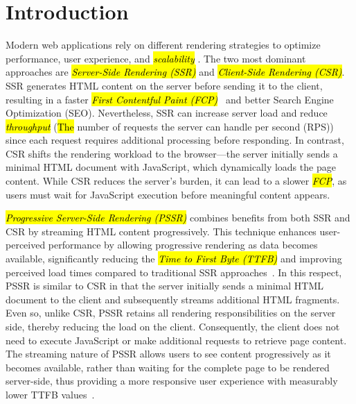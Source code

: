 \documentclass[software,article,accept,pdftex,moreauthors]{Definitions/mdpi}
\begin{document}

\section{Introduction}


Modern web applications rely on different rendering strategies to optimize
performance, user experience, and \textit{\hl{scalability}%
}. The two most dominant
approaches are \textit{\hl{Server-Side Rendering (SSR)}} and \textit{\hl{Client-Side Rendering (CSR)}}. SSR generates HTML content on the server before sending it to the client, resulting in a faster \textit{\hl{First Contentful Paint (FCP)}}~\cite{Edgar2024-FCP} and better Search Engine Optimization (SEO). Nevertheless, SSR
can increase server load and reduce \textit{\hl{throughput}} ({\hl{The} %
 number of
    requests the server can handle per second (RPS)}) since each request requires
additional processing before responding. In contrast, CSR shifts the rendering
workload to the browser---the server initially sends a minimal HTML document with
JavaScript, which dynamically loads the page content. While CSR reduces the
server’s burden, it can lead to a slower \textit{\hl{FCP}}, as users must wait for
JavaScript execution before meaningful content appears.

\textit{\hl{Progressive Server-Side Rendering (PSSR)}} combines benefits from both SSR and CSR
by streaming HTML content progressively. This technique enhances user-perceived performance by
allowing progressive rendering as data becomes available, significantly reducing the
\textit{\hl{Time to First Byte (TTFB)}} and improving perceived load times compared to traditional
SSR approaches~\cite{wise2024pssr}. In this respect,
PSSR is similar to CSR in that the server initially sends a minimal HTML
document to the client and subsequently streams additional HTML fragments.
Even so, unlike CSR, PSSR retains all rendering responsibilities on the server side,
thereby reducing the load on the client. Consequently, the client does
not need to execute JavaScript or make additional requests to retrieve page content.
The streaming nature of PSSR allows users to see content progressively as it becomes
available, rather than waiting for the complete page to be rendered server-side,
thus providing a more responsive user experience with measurably lower TTFB values~\cite{wise2024pssr}.
\end{document}

